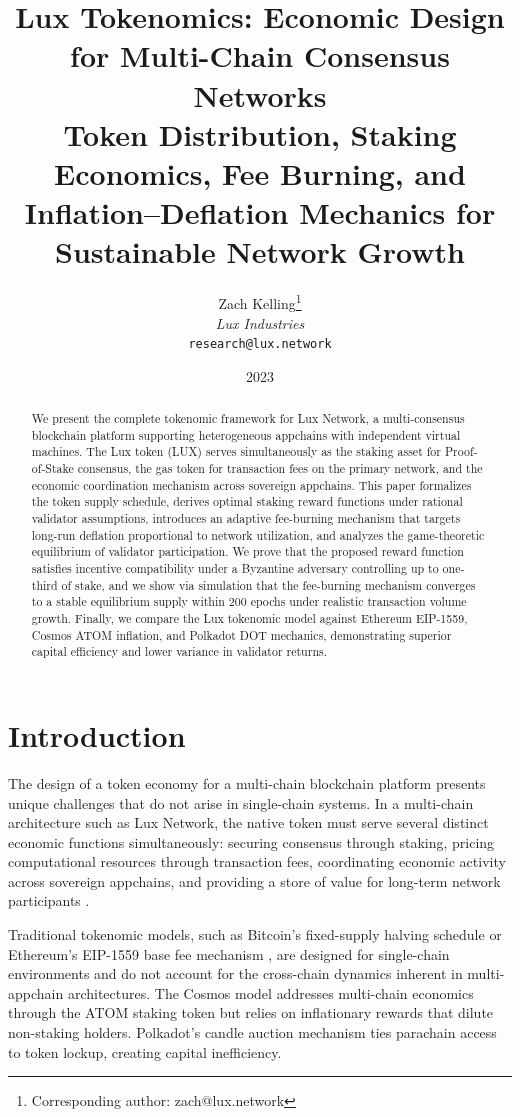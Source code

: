 \documentclass[11pt,a4paper]{article}
\title{\textbf{Lux Tokenomics: Economic Design for Multi-Chain Consensus Networks}\\[6pt]
\large Token Distribution, Staking Economics, Fee Burning, and\\Inflation--Deflation Mechanics for Sustainable Network Growth}
\author{
Zach Kelling\thanks{Corresponding author: zach@lux.network}\\
\textit{Lux Industries}\\
\texttt{research@lux.network}
}
\date{2023}
\begin{document}
\luxcoverpage
\maketitle

\begin{abstract}
We present the complete tokenomic framework for Lux Network, a multi-consensus blockchain platform supporting heterogeneous appchains with independent virtual machines. The Lux token (LUX) serves simultaneously as the staking asset for Proof-of-Stake consensus, the gas token for transaction fees on the primary network, and the economic coordination mechanism across sovereign appchains. This paper formalizes the token supply schedule, derives optimal staking reward functions under rational validator assumptions, introduces an adaptive fee-burning mechanism that targets long-run deflation proportional to network utilization, and analyzes the game-theoretic equilibrium of validator participation. We prove that the proposed reward function satisfies incentive compatibility under a Byzantine adversary controlling up to one-third of stake, and we show via simulation that the fee-burning mechanism converges to a stable equilibrium supply within 200 epochs under realistic transaction volume growth. Finally, we compare the Lux tokenomic model against Ethereum EIP-1559, Cosmos ATOM inflation, and Polkadot DOT mechanics, demonstrating superior capital efficiency and lower variance in validator returns.
\end{abstract}

\section{Introduction}

The design of a token economy for a multi-chain blockchain platform presents unique challenges that do not arise in single-chain systems. In a multi-chain architecture such as Lux Network, the native token must serve several distinct economic functions simultaneously: securing consensus through staking, pricing computational resources through transaction fees, coordinating economic activity across sovereign appchains, and providing a store of value for long-term network participants \cite{nakamoto2008bitcoin, buterin2014ethereum}.

Traditional tokenomic models, such as Bitcoin's fixed-supply halving schedule \cite{nakamoto2008bitcoin} or Ethereum's EIP-1559 base fee mechanism \cite{roughgarden2020eip1559}, are designed for single-chain environments and do not account for the cross-chain dynamics inherent in multi-appchain architectures. The Cosmos model \cite{kwon2016cosmos} addresses multi-chain economics through the ATOM staking token but relies on inflationary rewards that dilute non-staking holders. Polkadot's candle auction mechanism \cite{wood2016polkadot} ties parachain access to token lockup, creating capital inefficiency.
\end{document}
